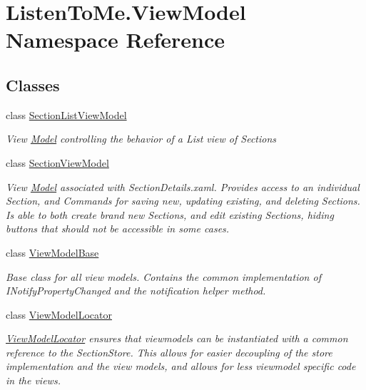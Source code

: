 \hypertarget{namespace_listen_to_me_1_1_view_model}{}\section{Listen\+To\+Me.\+View\+Model Namespace Reference}
\label{namespace_listen_to_me_1_1_view_model}
\subsection*{Classes}
\begin{DoxyCompactItemize}
\item 
class \mbox{\hyperlink{class_listen_to_me_1_1_view_model_1_1_section_list_view_model}{Section\+List\+View\+Model}}
\begin{DoxyCompactList}\small\item\em View \mbox{\hyperlink{namespace_listen_to_me_1_1_model}{Model}} controlling the behavior of a List view of Sections \end{DoxyCompactList}\item 
class \mbox{\hyperlink{class_listen_to_me_1_1_view_model_1_1_section_view_model}{Section\+View\+Model}}
\begin{DoxyCompactList}\small\item\em View \mbox{\hyperlink{namespace_listen_to_me_1_1_model}{Model}} associated with Section\+Details.\+xaml. Provides access to an individual Section, and Commands for saving new, updating existing, and deleting Sections. Is able to both create brand new Sections, and edit existing Sections, hiding buttons that should not be accessible in some cases. \end{DoxyCompactList}\item 
class \mbox{\hyperlink{class_listen_to_me_1_1_view_model_1_1_view_model_base}{View\+Model\+Base}}
\begin{DoxyCompactList}\small\item\em Base class for all view models. Contains the common implementation of I\+Notify\+Property\+Changed and the notification helper method. \end{DoxyCompactList}\item 
class \mbox{\hyperlink{class_listen_to_me_1_1_view_model_1_1_view_model_locator}{View\+Model\+Locator}}
\begin{DoxyCompactList}\small\item\em \mbox{\hyperlink{class_listen_to_me_1_1_view_model_1_1_view_model_locator}{View\+Model\+Locator}} ensures that viewmodels can be instantiated with a common reference to the Section\+Store. This allows for easier decoupling of the store implementation and the view models, and allows for less viewmodel specific code in the views. \end{DoxyCompactList}\end{DoxyCompactItemize}
